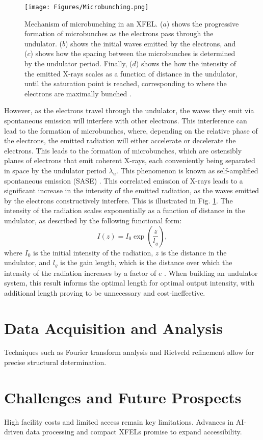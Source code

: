 \documentclass[aps,prb,twocolumn,superscriptaddress]{revtex4-2}
\begin{document}
\begin{figure}[h]
    \centering
    \texttt{[image: Figures/Microbunching.png]}
    \caption{Mechanism of microbunching in an XFEL. ($a$) shows the progressive
        formation of microbunches as the electrons pass through the undulator.
        ($b$) shows the initial waves emitted by the electrons, and ($c$) shows
        how the spacing between the microbunches is determined by the undulator
        period. Finally, ($d$) shows the how the intensity of the emitted X-rays
        scales as a function of distance in the undulator, until the saturation
        point is reached, corresponding to where the electrons are maximally 
        bunched \cite{EMMA}.}
    \label{fig:Undulator}
\end{figure}
However, as the electrons travel through the
undulator, the waves they emit via spontaneous emission will interfere with 
other electrons. This interference can lead to the formation of microbunches,
where, depending on the relative phase of the electrons, the emitted radiation
will either accelerate or decelerate the electrons. This leads to the formation
of microbunches, which are ostensibly planes of electrons that emit coherent
X-rays, each conveniently being separated in space by the undulator period
$\lambda_u$. This phenomenon is known as self-amplified spontaneous emission 
(SASE) \cite{Saldin2006}.
This correlated emission of X-rays leads to a significant increase in the intensity
of the emitted radiation, as the waves emitted by the electrons constructively
interfere. This is illustrated in Fig. \ref{fig:Undulator}. The intensity of the
radiation scales exponentially as a function of distance in the undulator, as described 
by the following functional form:
\begin{equation}
    I(z) = I_0\exp\left(\frac{z}{l_g}\right),
\end{equation}
where $I_0$ is the initial intensity of the radiation, $z$ is the distance in the
undulator, and $l_g$ is the gain length, which is the distance over which the
intensity of the radiation increases by a factor of $e$ \cite{Bonifacio}. When 
building an undulator system, this result informs the optimal length for 
optimal output intensity, with additional length proving to be unnecessary 
and cost-ineffective.
\newpage






\section{Data Acquisition and Analysis} \label{sec:data}
Techniques such as Fourier transform analysis and Rietveld refinement allow for precise structural determination.

\section{Challenges and Future Prospects} \label{sec:challenges}
High facility costs and limited access remain key limitations. Advances in AI-driven data processing and compact XFELs
promise to expand accessibility.



\end{document}
